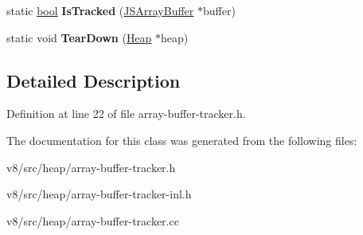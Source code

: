 \begin{DoxyCompactItemize}
\item 
\mbox{\label{classv8_1_1internal_1_1ArrayBufferTracker_a80339898b2856cf714284ef9bab231cb}} 
static \mbox{\hyperlink{classbool}{bool}} {\bfseries Is\+Tracked} (\mbox{\hyperlink{classv8_1_1internal_1_1JSArrayBuffer}{J\+S\+Array\+Buffer}} $\ast$buffer)
\item 
\mbox{\label{classv8_1_1internal_1_1ArrayBufferTracker_a9770015abcd7b9ffff092b933b24295d}} 
static void {\bfseries Tear\+Down} (\mbox{\hyperlink{classv8_1_1internal_1_1Heap}{Heap}} $\ast$heap)
\end{DoxyCompactItemize}


\subsection{Detailed Description}


Definition at line 22 of file array-\/buffer-\/tracker.\+h.



The documentation for this class was generated from the following files\+:\begin{DoxyCompactItemize}
\item 
v8/src/heap/array-\/buffer-\/tracker.\+h\item 
v8/src/heap/array-\/buffer-\/tracker-\/inl.\+h\item 
v8/src/heap/array-\/buffer-\/tracker.\+cc\end{DoxyCompactItemize}
